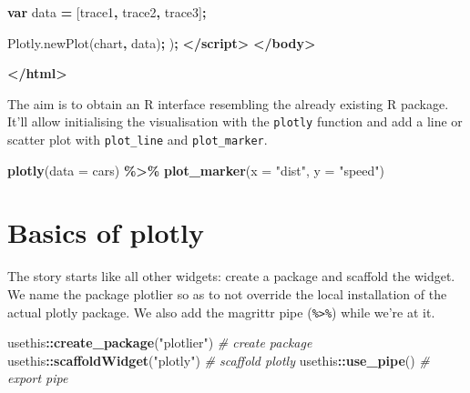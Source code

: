 \documentclass[
]{krantz}
\makeatletter
\newenvironment{Shaded}{\begin{snugshade}}{\end{snugshade}}
\newcommand{\AttributeTok}[1]{\textcolor[rgb]{0.61,0.61,0.61}{#1}}
\newcommand{\CommentTok}[1]{\textcolor[rgb]{0.37,0.37,0.37}{\textit{#1}}}
\newcommand{\DataTypeTok}[1]{\textcolor[rgb]{0.27,0.27,0.27}{#1}}
\newcommand{\KeywordTok}[1]{\textcolor[rgb]{0.27,0.27,0.27}{\textbf{#1}}}
\newcommand{\NormalTok}[1]{#1}
\newcommand{\OperatorTok}[1]{\textcolor[rgb]{0.43,0.43,0.43}{\textbf{#1}}}
\newcommand{\StringTok}[1]{\textcolor[rgb]{0.5,0.5,0.5}{#1}}
\newcommand{\VariableTok}[1]{\textcolor[rgb]{0,0,0}{#1}}
\newenvironment{kframe}{%
\medskip{}
\setlength{\fboxsep}{.8em}
 \def\at@end@of@kframe{}%
 \ifinner\ifhmode%
  \def\at@end@of@kframe{\end{minipage}}%
  \begin{minipage}{\columnwidth}%
 \fi\fi%
 \def\FrameCommand##1{\hskip\@totalleftmargin \hskip-\fboxsep
 \colorbox{shadecolor}{##1}\hskip-\fboxsep
     \hskip-\linewidth \hskip-\@totalleftmargin \hskip\columnwidth}%
 \MakeFramed {\advance\hsize-\width
   \@totalleftmargin\z@ \linewidth\hsize
   \@setminipage}}%
 {\par\unskip\endMakeFramed%
 \at@end@of@kframe}
\renewenvironment{Shaded}{\begin{kframe}}{\end{kframe}}
\makeatother
\begin{document}
\begin{Shaded}
\begin{Highlighting}[]
    \KeywordTok{var}\NormalTok{ data }\OperatorTok{=}\NormalTok{ [trace1}\OperatorTok{,}\NormalTok{ trace2}\OperatorTok{,}\NormalTok{ trace3]}\OperatorTok{;}

    \VariableTok{Plotly}\NormalTok{.}\AttributeTok{newPlot}\NormalTok{(}\StringTok{\textquotesingle{}chart\textquotesingle{}}\OperatorTok{,}\NormalTok{ data)}\OperatorTok{;}
\NormalTok{    )}\OperatorTok{;}
  \KeywordTok{</script>}
\KeywordTok{</body>}

\KeywordTok{</html>}
\end{Highlighting}
\end{Shaded}

The aim is to obtain an R interface resembling the already existing R package. It'll allow initialising the visualisation with the \texttt{plotly} function and add a line or scatter plot with \texttt{plot\_line} and \texttt{plot\_marker}.

\begin{Shaded}
\begin{Highlighting}[]
\KeywordTok{plotly}\NormalTok{(}\DataTypeTok{data =}\NormalTok{ cars) }\OperatorTok{\%>\%}\StringTok{ }
\StringTok{  }\KeywordTok{plot\_marker}\NormalTok{(}\DataTypeTok{x =} \StringTok{"dist"}\NormalTok{, }\DataTypeTok{y =} \StringTok{"speed"}\NormalTok{)}
\end{Highlighting}
\end{Shaded}

\hypertarget{basics-of-plotly}{%
\section{Basics of plotly}\label{basics-of-plotly}}

The story starts like all other widgets: create a package and scaffold the widget. We name the package plotlier so as to not override the local installation of the actual plotly package. We also add the magrittr pipe (\texttt{\%\textgreater{}\%}) while we're at it.

\begin{Shaded}
\begin{Highlighting}[]
\NormalTok{usethis}\OperatorTok{::}\KeywordTok{create\_package}\NormalTok{(}\StringTok{"plotlier"}\NormalTok{) }\CommentTok{\# create package}
\NormalTok{usethis}\OperatorTok{::}\KeywordTok{scaffoldWidget}\NormalTok{(}\StringTok{"plotly"}\NormalTok{) }\CommentTok{\# scaffold plotly}
\NormalTok{usethis}\OperatorTok{::}\KeywordTok{use\_pipe}\NormalTok{() }\CommentTok{\# export pipe}
\end{Highlighting}
\end{Shaded}
\end{document}
